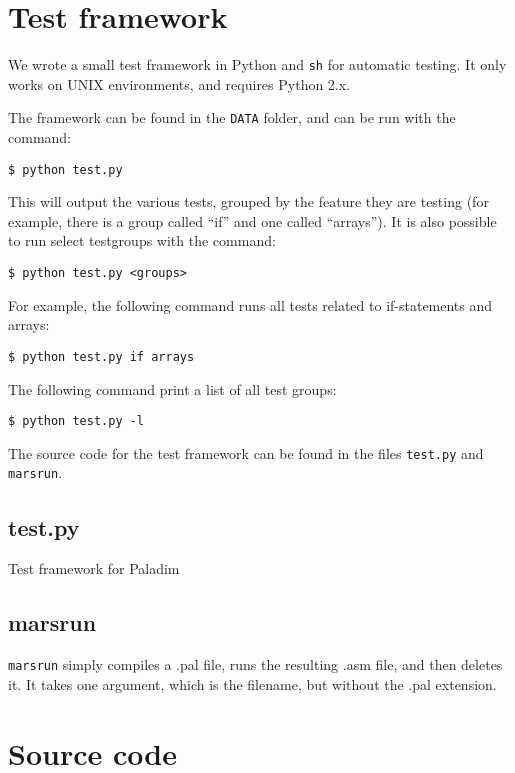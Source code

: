 \documentclass{article}
\begin{document}
\newpage
\begin{appendix}
\section{Test framework}
We wrote a small test framework in Python and \texttt{sh} for automatic testing. It only works on UNIX environments, and
requires Python 2.x.

The framework can be found in the \texttt{DATA} folder,
and can be run with the command:

\begin{verbatim}
$ python test.py
\end{verbatim}
This will output the various tests, grouped by the feature they are testing (for example, there is a group called
``if'' and one called ``arrays''). It is also possible to run select testgroups with the command:

\begin{verbatim}
$ python test.py <groups>
\end{verbatim}
For example, the following command runs all tests related to if-statements and arrays:

\begin{verbatim}
$ python test.py if arrays
\end{verbatim}

The following command print a list of all test groups:

\begin{verbatim}
$ python test.py -l
\end{verbatim}

The source code for the test framework can be found in the files \texttt{test.py} and \texttt{marsrun}.

\subsection{test.py}
Test framework for Paladim

\subsection{marsrun}
\texttt{marsrun} simply compiles a .pal file, runs the resulting .asm file, and then deletes it. It takes one
argument, which is the filename, but without the .pal extension.


\section{Source code}

\end{appendix}
\end{document}
